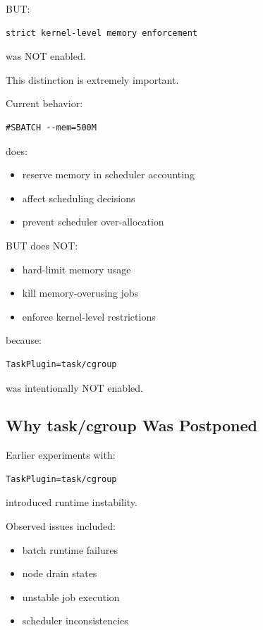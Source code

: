 \documentclass[11pt]{article}
\begin{document}
BUT:

\begin{verbatim}
strict kernel-level memory enforcement
\end{verbatim}

was NOT enabled.

This distinction is extremely important.

Current behavior:

\begin{verbatim}
#SBATCH --mem=500M
\end{verbatim}

does:

\begin{itemize}
\item reserve memory in scheduler accounting
\item affect scheduling decisions
\item prevent scheduler over-allocation
\end{itemize}

BUT does NOT:

\begin{itemize}
\item hard-limit memory usage
\item kill memory-overusing jobs
\item enforce kernel-level restrictions
\end{itemize}

because:

\begin{verbatim}
TaskPlugin=task/cgroup
\end{verbatim}

was intentionally NOT enabled.
\subsection{Why task/cgroup Was Postponed}
\label{sec:org16bf535}

Earlier experiments with:

\begin{verbatim}
TaskPlugin=task/cgroup
\end{verbatim}

introduced runtime instability.

Observed issues included:

\begin{itemize}
\item batch runtime failures
\item node drain states
\item unstable job execution
\item scheduler inconsistencies
\end{itemize}
\end{document}
